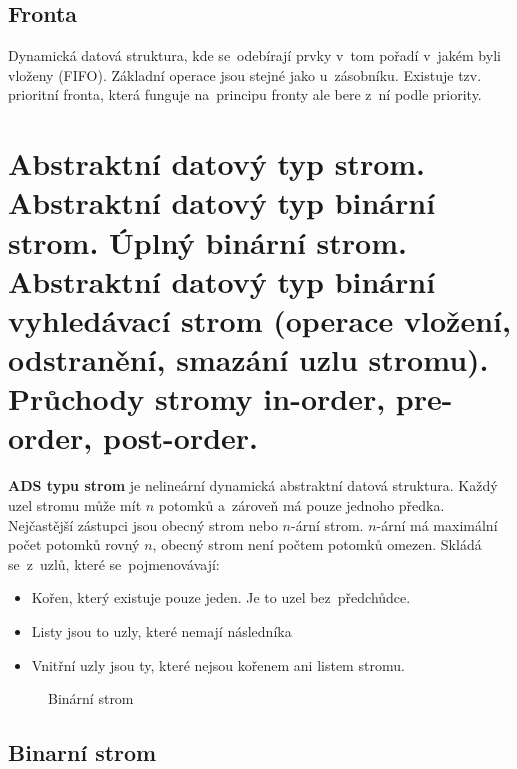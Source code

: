 \subsection{Fronta}

Dynamická datová struktura, kde se~odebírají prvky v~tom pořadí v~jakém byli vloženy (FIFO). Základní operace jsou stejné jako u~zásobníku. Existuje tzv. prioritní fronta, která funguje na~principu fronty ale bere z~ní podle priority.

\clearpage
\section{Abstraktní datový typ strom. Abstraktní datový typ binární strom. Úplný binární strom. Abstraktní datový typ binární vyhledávací strom (operace vložení, odstranění, smazání uzlu stromu). Průchody stromy in-order, pre-order, post-order.}

\textbf{ADS typu strom} je nelineární dynamická abstraktní datová struktura. Každý uzel stromu může mít $n$ potomků a~zároveň má pouze jednoho předka. Nejčastější zástupci jsou obecný strom nebo $n$-ární strom. $n$-ární má maximální počet potomků rovný $n$, obecný strom není počtem potomků omezen. Skládá se~z~uzlů, které se~pojmenovávají:

\begin{itemize}[noitemsep]
	\item Kořen, který existuje pouze jeden. Je to uzel bez~předchůdce.
	\item Listy jsou to uzly, které nemají následníka
	\item Vnitřní uzly jsou ty, které nejsou kořenem ani listem stromu.
\end{itemize}

\begin{figure}[ht]
	\centering
	\caption{Binární strom}
\end{figure}

\subsection{Binarní strom}

